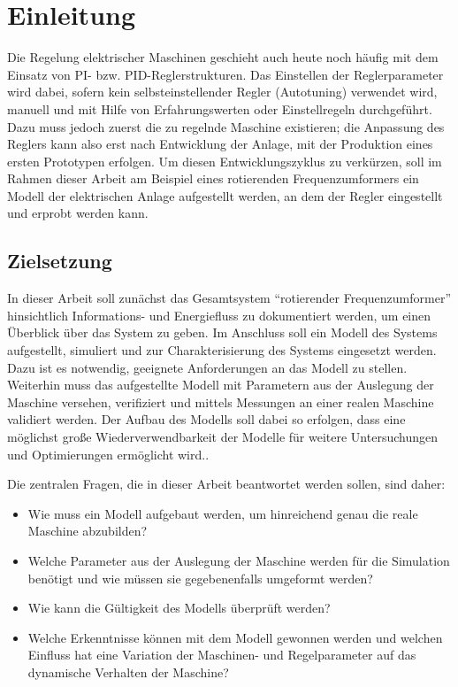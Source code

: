 \chapter{Einleitung}
\label{chap:Einleitung}
Die Regelung elektrischer Maschinen geschieht auch heute noch häufig mit
dem Einsatz von PI- bzw. PID-Reglerstrukturen. Das Einstellen der
Reglerparameter wird dabei, sofern kein selbsteinstellender Regler
(Autotuning) verwendet wird, manuell und mit Hilfe von Erfahrungswerten
oder Einstellregeln durchgeführt. Dazu muss jedoch zuerst die zu
regelnde Maschine existieren; die Anpassung des Reglers kann also erst
nach Entwicklung der Anlage, mit der Produktion eines ersten Prototypen
erfolgen. Um diesen Entwicklungszyklus zu verkürzen, soll im Rahmen
dieser Arbeit am Beispiel eines rotierenden Frequenzumformers ein Modell
der elektrischen Anlage aufgestellt werden, an dem der Regler
eingestellt und erprobt werden kann.

\section{Zielsetzung}
\label{sec:Zielsetzung}
In dieser Arbeit soll zunächst das Gesamtsystem ``rotierender
Frequenzumformer'' hinsichtlich Informations- und Energiefluss zu
dokumentiert werden, um einen Überblick über das System zu geben. Im
Anschluss soll ein Modell des Systems aufgestellt, simuliert und zur
Charakterisierung des Systems eingesetzt werden. Dazu ist es notwendig,
geeignete Anforderungen an das Modell zu stellen. Weiterhin muss das aufgestellte Modell
mit Parametern aus der Auslegung der Maschine versehen, verifiziert und mittels
Messungen an einer realen Maschine validiert werden. Der Aufbau des
Modells soll dabei so erfolgen, dass eine möglichst große
Wiederverwendbarkeit der Modelle für weitere Untersuchungen und Optimierungen ermöglicht wird..

Die zentralen Fragen, die in dieser Arbeit beantwortet werden sollen,
sind daher:
\begin{itemize}
\item Wie muss ein Modell aufgebaut werden, um hinreichend genau die reale Maschine abzubilden?
\item Welche Parameter aus der Auslegung der Maschine werden für die Simulation benötigt und wie müssen sie gegebenenfalls umgeformt werden?
\item Wie kann die Gültigkeit des Modells überprüft werden?
\item Welche Erkenntnisse können mit dem Modell gewonnen werden und welchen Einfluss hat eine Variation der Maschinen- und Regelparameter auf das dynamische Verhalten der Maschine?
\end{itemize}

